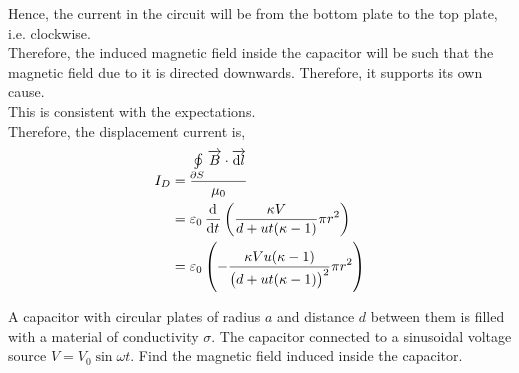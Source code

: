 \documentclass[fleqn, a4paper, 8pt, twoside]{amsart}
\theoremstyle{definition}
\theoremstyle{theorem}
\begin{document}
\begin{multicols}{2}
\begin{spacing}{0.6}
\begin{solution}
	Hence, the current in the circuit will be from the bottom plate to the top plate, i.e. clockwise.\\
	Therefore, the induced magnetic field inside the capacitor will be such that the magnetic field due to it is directed downwards.
	Therefore, it supports its own cause.\\
	This is consistent with the expectations.\\
	Therefore, the displacement current is,
	\begin{align*}
		I_D & = \frac{\oint\limits_{\partial S} \overrightarrow{B} \cdot \overrightarrow{\dif l}}{\mu_0} \\
                    & = \varepsilon_0 \dod{}{t}\left( \frac{\kappa V}{d + u t (\kappa - 1)} \pi r^2 \right)      \\
                    & = \varepsilon_0 \left( -\frac{\kappa V u (\kappa - 1)}{\left( d + u t (\kappa - 1) \right)^2} \pi r^2 \right)
	\end{align*}
\end{solution}

\begin{question}
	A capacitor with circular plates of radius $a$ and distance $d$ between them is filled with a material of conductivity $\sigma$.
	The capacitor connected to a sinusoidal voltage source $V = V_0 \sin \omega t$.
	Find the magnetic field induced inside the capacitor.
\end{question}


\end{spacing}
\end{multicols}
\end{document}
